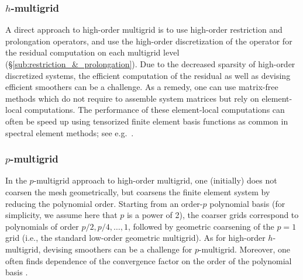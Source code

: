 \documentclass[smallcondensed,final]{svjour3}     %
\newcommand{\gsnote}[1]{\textcolor{blue}{GS: #1}}
\begin{document}
\subsubsection{$h$-multigrid}\label{subsec:h}
A direct approach to high-order multigrid is to use high-order
restriction and prolongation operators, and use the high-order
discretization of the operator for the residual computation on each
multigrid level (\S\ref{sub:restriction_&_prolongation}).
Due to the decreased sparsity of high-order discretized systems, the
efficient computation of the residual as well as devising efficient
smoothers can be a challenge. As a remedy, one can use matrix-free
methods which do not require to assemble system matrices but rely on
element-local computations. The performance of these element-local
computations can often be speed up using tensorized finite element
basis functions as common in spectral element methods; see
e.g.~\cite{DevilleFischerMund02}. 

\subsubsection{$p$-multigrid}\label{subsec:p}
In the $p$-multigrid approach to high-order multigrid, one (initially)
does not coarsen the mesh geometrically, but coarsens the finite
element system by
reducing the polynomial order. Starting from an order-$p$ polynomial
basis (for simplicity, we assume here that $p$ is a power of 2), the
coarser grids correspond to polynomials of order $p/2, p/4,\ldots,1$,
followed by geometric coarsening of the $p=1$ grid (i.e., the standard
low-order geometric multigrid). 
As for high-order $h$-multigrid, devising smoothers can be a challenge for
$p$-multigrid.  Moreover, one often finds dependence of the
convergence factor on the order of the polynomial basis
\cite{MadayMunoz89}.
\end{document}
